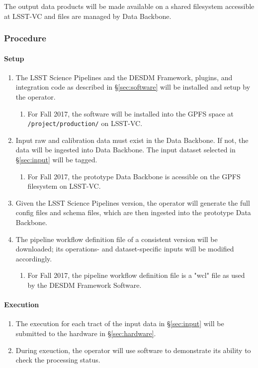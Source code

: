 The output data products will be made available on a shared filesystem accessible at LSST-VC and files are managed by Data Backbone.

\subsubsection{Procedure}

\paragraph{Setup}
\begin{enumerate}

  \item{The LSST Science Pipelines and the DESDM Framework, plugins, and integration code as described in \S\ref{sec:software}  will be installed and setup by the operator.}
  \begin{enumerate}
    \item{For Fall 2017, the software will be installed into the GPFS space at \texttt{/project/production/} on LSST-VC.}
  \end{enumerate}
  \item{Input raw and calibration data must exist in the Data Backbone. If not, the data will be ingested into Data Backbone.  The input dataset selected in \S\ref{sec:input} will be tagged.}
  \begin{enumerate}
    \item{For Fall 2017, the prototype Data Backbone is acessible on the GPFS filesystem on LSST-VC.}
  \end{enumerate}
  \item{Given the LSST Science Pipelines version, the operator will generate the full config files and schema files, which are then ingested into the prototype Data Backbone.}
  \item{The pipeline workflow definition file of a consistent version will be downloaded; its operations- and dataset-specific inputs will be modified accordingly.}
  \begin{enumerate}
    \item{For Fall 2017, the pipeline workflow definition file is a "wcl" file as used by the DESDM Framework Software.}
  \end{enumerate}
\end{enumerate}

\paragraph{Execution}
\begin{enumerate}
  \item{The execution for each tract of the input data in \S\ref{sec:input} will be submitted to the hardware in \S\ref{sec:hardware}.}
  \item{During exeuction, the operator will use software to demonstrate its ability to check the processing status.}
\end{enumerate}

